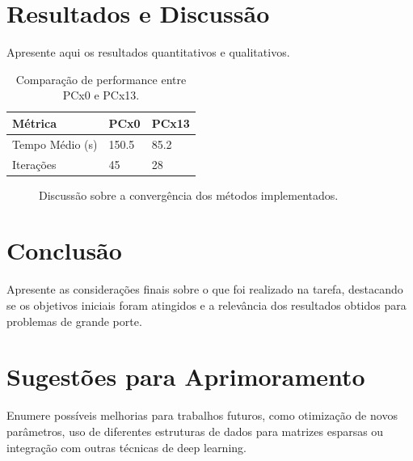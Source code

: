 \documentclass[11pt, letterpaper]{article}
\begin{document}
\section{Resultados e Discussão}
Apresente aqui os resultados quantitativos e qualitativos.

\begin{table}[h]
\centering
\caption{Comparação de performance entre PCx0 e PCx13.}
\begin{tabular}{@{}lll@{}}
\toprule
Métrica & PCx0 & PCx13 \\ \midrule
Tempo Médio (s) & 150.5 & 85.2 \\
Iterações & 45 & 28 \\ \bottomrule
\end{tabular}
\end{table}

\begin{figure}[h]
\centering
\caption{Discussão sobre a convergência dos métodos implementados.}
\end{figure}


\newpage
\section{Conclusão}
Apresente as considerações finais sobre o que foi realizado na tarefa, destacando se os objetivos iniciais foram atingidos e a relevância dos resultados obtidos para problemas de grande porte.

\section{Sugestões para Aprimoramento}
Enumere possíveis melhorias para trabalhos futuros, como otimização de novos parâmetros, uso de diferentes estruturas de dados para matrizes esparsas ou integração com outras técnicas de deep learning.

\newpage

\end{document}

